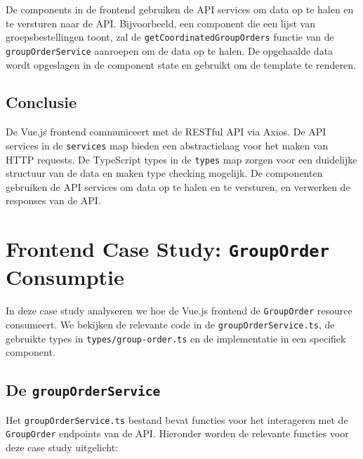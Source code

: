 De components in de frontend gebruiken de API services om data op te halen en te versturen naar de API. Bijvoorbeeld, een component die een lijst van groepsbestellingen toont, zal de \texttt{getCoordinatedGroupOrders} functie van de \texttt{groupOrderService} aanroepen om de data op te halen. De opgehaalde data wordt opgeslagen in de component state en gebruikt om de template te renderen.

\subsection{Conclusie}

De Vue.js frontend communiceert met de RESTful API via Axios. De API services in de \texttt{services} map bieden een abstractielaag voor het maken van HTTP requests. De TypeScript types in de \texttt{types} map zorgen voor een duidelijke structuur van de data en maken type checking mogelijk. De componenten gebruiken de API services om data op te halen en te versturen, en verwerken de responses van de API.

\section{Frontend Case Study: \texttt{GroupOrder} Consumptie}

In deze case study analyseren we hoe de Vue.js frontend de \texttt{GroupOrder} resource consumeert. We bekijken de relevante code in de \texttt{groupOrderService.ts}, de gebruikte types in \texttt{types/group-order.ts} en de implementatie in een specifiek component.

\subsection{De \texttt{groupOrderService}}

Het \texttt{groupOrderService.ts} bestand bevat functies voor het interageren met de \texttt{GroupOrder} endpoints van de API. Hieronder worden de relevante functies voor deze case study uitgelicht:

